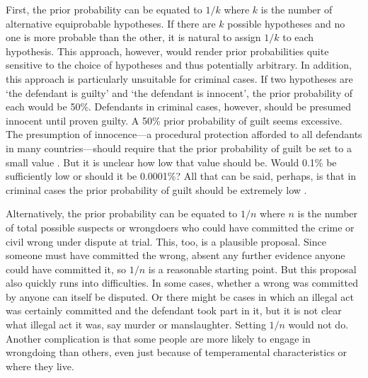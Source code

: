 \documentclass{article}
\begin{document}
First, the prior probability can be equated to $1/k$ where $k$ is the number of alternative equiprobable hypotheses. If there are $k$ possible hypotheses and no one is more probable than the other, it is natural to assign $1/k$ to each hypothesis.  
This approach, however, would render prior probabilities quite sensitive to the choice of hypotheses and thus potentially arbitrary.  In addition, this approach is particularly unsuitable for criminal cases. If two hypotheses are `the defendant is guilty' and `the defendant is innocent', the prior probability  of each would be 50\%. 
Defendants in criminal cases, however, should be presumed innocent until proven guilty. A 50\% prior probability of guilt seems excessive. 
The presumption of innocence---a procedural protection afforded to all defendants in many countries---should require that the prior probability of guilt be set to a small value \citep{friedmanEtAl1995}.  But it is unclear how low that value should be. Would 0.1\% be sufficiently low or should it be 0.0001\%?
All that can be said, perhaps, is that in criminal cases the prior probability of guilt should be extremely low \citep{Friedman2000}. 



Alternatively, the prior probability can be equated to $1/n$ where $n$ is the number of total possible suspects or wrongdoers who could have committed the crime or civil wrong under dispute at trial. This, too, is a plausible proposal. Since someone must have committed the wrong, absent any further evidence anyone could have committed it, so $1/n$ is a reasonable starting point. But  this proposal also quickly runs into difficulties. In some cases, whether a wrong was committed by anyone can itself be disputed. Or there might be cases in which an illegal act was certainly committed and the  defendant took part in it, but it is not clear what illegal act it was, say murder or manslaughter. Setting $1/n$ would not do. Another complication is that some people are more likely to engage in wrongdoing than others, even just because of temperamental characteristics or where they live. 
 
 
 
\end{document}
